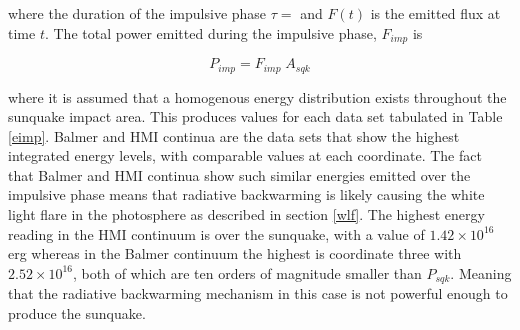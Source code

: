 \documentclass[11pt]{article}
\begin{document}
where the duration of the impulsive phase $\tau = $ and $F(t)$ is the emitted flux at time $t$. The total power emitted during the impulsive phase, $F_{imp}$ is

\begin{equation}
P_{imp}=F_{imp} \; A_{sqk}
\end{equation}\label{e-imp}

where it is assumed that a homogenous energy distribution exists throughout the sunquake impact area. This produces values for each data set tabulated in Table \ref{eimp}. Balmer and HMI continua are the data sets that show the highest integrated energy levels, with comparable values at each coordinate. The fact that Balmer and HMI continua show such similar energies emitted over the impulsive phase means that radiative backwarming is likely causing the white light flare in the photosphere as described in section \ref{wlf}. The highest energy reading in the HMI continuum is over the sunquake, with a value of $1.42{\times}10^{16}$ erg whereas in the Balmer continuum the highest is coordinate three with $2.52{\times}10^{16}$, both of which are ten orders of magnitude smaller than $P_{sqk}$. Meaning that the radiative backwarming mechanism in this case is not powerful enough to produce the sunquake.    
\end{document}
